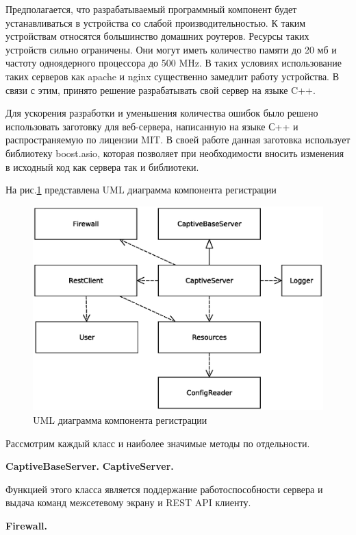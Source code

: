 Предполагается, что разрабатываемый программный компонент будет устанавливаться в устройства со слабой производительностью. К таким устройствам относятся большинство домашних роутеров. Ресурсы таких устройств сильно ограничены. Они могут иметь количество памяти до 20 мб и частоту одноядерного процессора до 500 MHz. В таких условиях использование таких серверов как apache и nginx существенно замедлит работу устройства. В связи с этим, принято решение разрабатывать свой сервер на языке C++.

Для ускорения разработки и уменьшения количества ошибок было решено использовать заготовку для веб-сервера\cite{simpleServer}, написанную на языке С++ и распространяемую по лицензии MIT\cite{simpleServerMIT}. В своей работе данная заготовка использует библиотеку boost.asio\cite{boost}, которая позволяет при необходимости вносить изменения в исходный код как сервера так и библиотеки.

На рис.\ref{fig:CPUML} представлена UML диаграмма компонента регистрации

\begin{figure}[H]
	\centering
	\includegraphics[width=\linewidth]{fig/CPUML}
	\caption{UML диаграмма компонента регистрации}
	\label{fig:CPUML}
\end{figure}

Рассмотрим каждый класс и наиболее значимые методы по отдельности.

\textbf{CaptiveBaseServer.}
\textbf{CaptiveServer.}

Функцией этого класса является поддержание работоспособности сервера и выдача команд межсетевому экрану и REST API клиенту.

\textbf{Firewall.}

